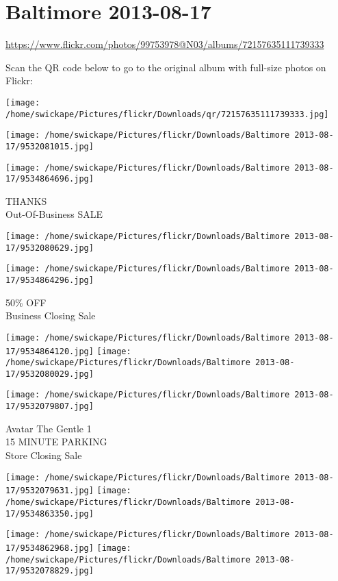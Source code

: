 \documentclass[10pt,letterpaper]{article}
\title{}
\author{}
\date{}
\begin{document}
\section*{Baltimore 2013-08-17}

\url{https://www.flickr.com/photos/99753978@N03/albums/72157635111739333}

Scan the QR code below to go to the original album with full-size photos on Flickr:

\texttt{[image: /home/swickape/Pictures/flickr/Downloads/qr/72157635111739333.jpg]}
\pagebreak

\texttt{[image: /home/swickape/Pictures/flickr/Downloads/Baltimore 2013-08-17/9532081015.jpg]}

\vspace{0.25in}
\texttt{[image: /home/swickape/Pictures/flickr/Downloads/Baltimore 2013-08-17/9534864696.jpg]}

THANKS\\
Out{-}Of{-}Business SALE
\pagebreak

\texttt{[image: /home/swickape/Pictures/flickr/Downloads/Baltimore 2013-08-17/9532080629.jpg]}

\vspace{0.25in}
\texttt{[image: /home/swickape/Pictures/flickr/Downloads/Baltimore 2013-08-17/9534864296.jpg]}

50\% OFF\\
Business Closing Sale
\pagebreak

\texttt{[image: /home/swickape/Pictures/flickr/Downloads/Baltimore 2013-08-17/9534864120.jpg]}
\texttt{[image: /home/swickape/Pictures/flickr/Downloads/Baltimore 2013-08-17/9532080029.jpg]}

\vspace{0.25in}
\texttt{[image: /home/swickape/Pictures/flickr/Downloads/Baltimore 2013-08-17/9532079807.jpg]}

Avatar The Gentle 1\\
15 MINUTE PARKING\\
Store Closing Sale
\pagebreak

\texttt{[image: /home/swickape/Pictures/flickr/Downloads/Baltimore 2013-08-17/9532079631.jpg]}
\texttt{[image: /home/swickape/Pictures/flickr/Downloads/Baltimore 2013-08-17/9534863350.jpg]}

\texttt{[image: /home/swickape/Pictures/flickr/Downloads/Baltimore 2013-08-17/9534862968.jpg]}
\texttt{[image: /home/swickape/Pictures/flickr/Downloads/Baltimore 2013-08-17/9532078829.jpg]}
\end{document}
